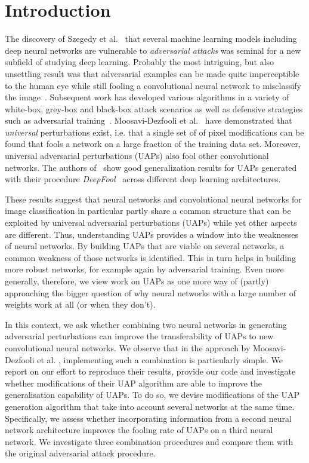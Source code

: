 \documentclass[runningheads]{llncs}
\begin{document}
\section{Introduction}
The discovery of Szegedy et al.~\cite{Szegedy_2014} that several machine learning models including deep neural networks are vulnerable to \emph{adversarial attacks} was seminal for a new subfield of studying deep learning. Probably the most intriguing, but also unsettling result was that adversarial examples can be made quite imperceptible to the human eye while still fooling a convolutional neural network to misclassify the image~\cite{goodfellow_2014}. Subsequent work has developed various algorithms in a variety of white-box, grey-box and black-box attack scenarios as well as defensive strategies such as adversarial training~\cite{REN2020346}. 
Moosavi-Dezfooli et al.~\cite{moosavidezfooli_universal_2017,moosavi-dezfooli_deepfool_2016} have demonstrated that \emph{universal} perturbations exist, i.e. that a single set of of pixel modifications can be found that fools a network on a large fraction of the training data set. Moreover, universal adversarial perturbations (UAPs) also fool other convolutional networks. The authors of~\cite{moosavidezfooli_universal_2017,moosavi-dezfooli_deepfool_2016} show good generalization results for UAPs generated with their procedure \emph{DeepFool}~\cite{moosavi-dezfooli_deepfool_2016} across different deep learning architectures.  

These results suggest that neural networks and convolutional neural networks for image classification in particular partly share a common structure that can be exploited by universal adversarial perturbations (UAPs) while yet other aspects are different. Thus, understanding UAPs provides a window into the weaknesses of neural networks. By building UAPs that are viable on several networks, a common weakness of those networks is identified. This in turn helps in building more robust networks, for example again by adversarial training. Even more generally, therefore, we view work on UAPs as one more way of (partly) approaching the bigger question of why neural networks with a large number of weights work at all (or when they don't).

In this context, we ask whether combining two neural networks in generating adversarial perturbations can improve the transferability of UAPs to new convolutional neural networks. We observe that in the approach by Moosavi-Dezfooli et al. \cite{moosavidezfooli_universal_2017,moosavi-dezfooli_deepfool_2016}, implementing such a combination is particularly simple. 
We report on our effort to reproduce their results, provide our code and investigate whether modifications of their UAP algorithm are able to improve the generalisation capability of UAPs. To do so, we devise modifications of the UAP generation algorithm that take into account several networks at the same time. Specifically, we assess whether incorporating information from a second neural network architecture improves the fooling rate of UAPs on a third neural network. We investigate three combination procedures and compare them with the original adversarial attack procedure.
\end{document}
